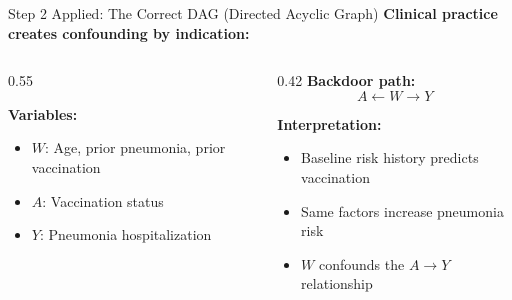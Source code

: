 \documentclass[aspectratio=169]{beamer}
\begin{document}
\begin{frame}{Step 2 Applied: The Correct DAG (Directed Acyclic Graph)}
  \small
  \textbf{Clinical practice creates confounding by indication:}
  \vspace{0.3em}

  \begin{columns}[T]
    \begin{column}{0.55\textwidth}
      \begin{center}
      \end{center}
      \vspace{0.3em}

      \textbf{Variables:}
      \begin{itemize}
        \item $W$: Age, prior pneumonia, prior vaccination
        \item $A$: Vaccination status
        \item $Y$: Pneumonia hospitalization
      \end{itemize}
    \end{column}
    \begin{column}{0.42\textwidth}
      \textbf{Backdoor path:}
      \[
        A \leftarrow W \rightarrow Y
      \]
      \vspace{0.3em}

      \textbf{Interpretation:}
      \begin{itemize}
        \item Baseline risk history predicts vaccination
        \item Same factors increase pneumonia risk
        \item $W$ confounds the $A \to Y$ relationship
      \end{itemize}
    \end{column}
  \end{columns}
\end{frame}
\end{document}
